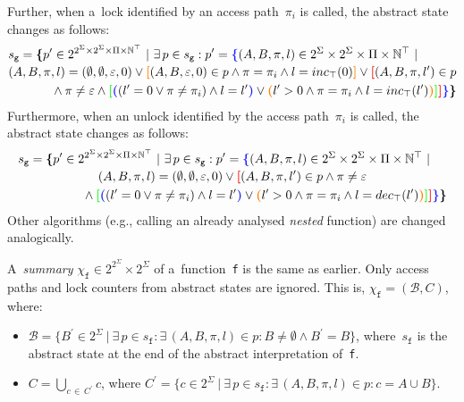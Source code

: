Further, when a~lock identified by an access path~$ \pi_i $ is called, the abstract state changes as follows:
$$
\begin{multlined}
    s_\mathtt{g} = \bb{\{}p^\prime \in 2^{2^\Sigma \times 2^\Sigma \times \Pi \times \mathbb{N}^\top}\ |\ \exists\,p \in s_\mathtt{g} : p^\prime = \bA{\{} (A, B, \pi, l) \in 2^\Sigma \times 2^\Sigma \times \Pi \times \mathbb{N}^\top\ |\ \\
%
    (A, B, \pi, l) = (\emptyset, \emptyset, \varepsilon, 0) \vee \bB{[}(A, B, \varepsilon, 0) \in p \wedge \pi = \pi_i \wedge l = inc_\top(0)\bB{]} \vee \bC{[}(A, B, \pi, l^\prime) \in p \\
%
    \wedge \pi \neq \varepsilon \wedge \bD{[}\bA{(}(l^\prime = 0 \vee \pi \neq \pi_i) \wedge l = l^\prime\bA{)} \vee \bB{(}l^\prime > 0 \wedge \pi = \pi_i \wedge l = inc_\top(l^\prime)%
%
    \bB{)}\bD{]}\bC{]}\bA{\}}\bb{\}}
\end{multlined}
$$
Furthermore, when an unlock identified by the access path~$ \pi_i $ is called, the abstract state changes as follows:
$$
\begin{multlined}
    s_\mathtt{g} = \bb{\{}p^\prime \in 2^{2^\Sigma \times 2^\Sigma \times \Pi \times \mathbb{N}^\top}\ |\ \exists\,p \in s_\mathtt{g} : p^\prime = \bA{\{} (A, B, \pi, l) \in 2^\Sigma \times 2^\Sigma \times \Pi \times \mathbb{N}^\top\ |\ \\
%
    (A, B, \pi, l) = (\emptyset, \emptyset, \varepsilon, 0) \vee \bC{[}(A, B, \pi, l^\prime) \in p \wedge \pi \neq \varepsilon \\
%
    \wedge \bD{[}\bA{(}(l^\prime = 0 \vee \pi \neq \pi_i) \wedge l = l^\prime\bA{)} \vee \bB{(}l^\prime > 0 \wedge \pi = \pi_i \wedge l = dec_\top(l^\prime)%
%
    \bB{)}\bD{]}\bC{]}\bA{\}}\bb{\}}
\end{multlined}
$$
Other algorithms (e.g., calling an already analysed \emph{nested} function) are changed analogically.

A~\emph{summary} $ \chi_\mathtt{f} \in 2^{2^\Sigma} \times 2^\Sigma $ of a~function~\texttt{f} is the same as earlier. Only access paths and lock counters from abstract states are ignored. This is, $ \chi_\mathtt{f} = (\mathcal{B}, C) $, where:
\begin{itemize}
    \item $ \mathcal{B} = \{B^\prime \in 2^\Sigma\ |\ \exists\,p \in s_\mathtt{f} : \exists\,(A, B, \pi, l) \in p : B \neq \emptyset \wedge B^\prime = B\} $, where~$ s_\mathtt{f} $ is the abstract state at the end of the abstract interpretation of~\texttt{f}.

    \item $ C = \bigcup\limits_{c\,\in\,C^\prime} c $, where $ C^\prime = \{c \in 2^\Sigma\ |\ \exists\,p \in s_\mathtt{f} : \exists\,(A, B, \pi, l) \in p : c = A \cup B\} $.
\end{itemize}

